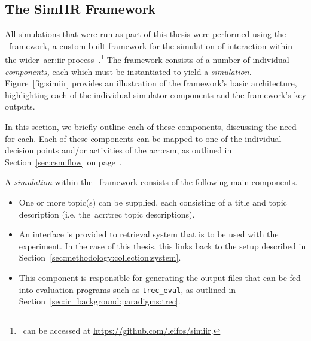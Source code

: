 \subsection{The SimIIR Framework}\label{sec:method:simulation:simiir}
All simulations that were run as part of this thesis were performed using the \simiir~framework, a custom built framework for the simulation of interaction within the wider~\gls{acr:iir} process~\citep{maxwell2016simiir}.\footnote{\simiir~can be accessed at \url{https://github.com/leifos/simiir}. } The framework consists of a number of individual \emph{components,} each which must be instantiated to yield a \emph{simulation.} Figure~\ref{fig:simiir} provides an illustration of the framework's basic architecture, highlighting each of the individual simulator components and the framework's key outputs.

In this section, we briefly outline each of these components, discussing the need for each. Each of these components can be mapped to one of the individual decision points and/or activities of the \gls{acr:csm}, as outlined in Section~\ref{sec:csm:flow} on page~\pageref{sec:csm:flow}.

A \emph{simulation} within the \simiir~framework consists of the following main components.

\begin{itemize}
    \item{ One or more topic(s) can be supplied, each consisting of a title and topic description (i.e. the~\gls{acr:trec} topic descriptions).}
    \item{ An interface is provided to retrieval system that is to be used with the experiment. In the case of this thesis, this links back to the setup described in Section~\ref{sec:methodology:collection:system}.}
    \item{ This component is responsible for generating the output files that can be fed into evaluation programs such as \texttt{trec\_eval}, as outlined in Section~\ref{sec:ir_background:paradigms:trec}.}
\end{itemize}

